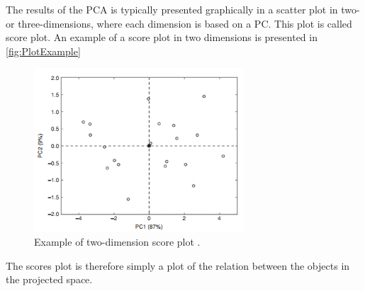 The results of the PCA is typically presented graphically in a scatter plot in two- or three-dimensions, where each dimension is based on a PC. This plot is called score plot. An example of a score plot in two dimensions is presented in \autoref{fig:PlotExample}
%
\begin{figure}[H]
\centering
\includegraphics[width =0.7\textwidth]{Figure/PlotExample}
\caption{Example of two-dimension score plot \parencite[p. 215]{Naes2010}.}
\label{fig:PlotExample}
\end{figure}
\noindent
%
The scores plot is therefore simply a plot of the relation between the objects in the projected space.